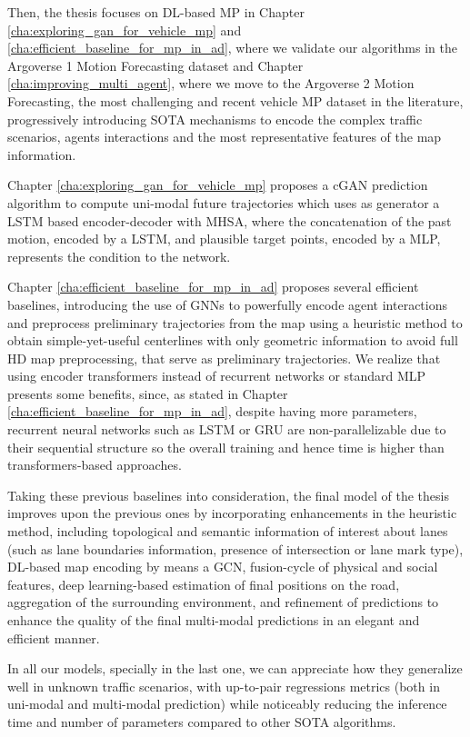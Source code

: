 Then, the thesis focuses on \acf{DL}-based \ac{MP} in Chapter \ref{cha:exploring_gan_for_vehicle_mp} and \ref{cha:efficient_baseline_for_mp_in_ad}, where we validate our algorithms in the Argoverse 1 Motion Forecasting dataset and Chapter \ref{cha:improving_multi_agent}, where we move to the Argoverse 2 Motion Forecasting, the most challenging and recent vehicle \ac{MP} dataset in the literature, progressively introducing \acf{SOTA} mechanisms to encode the complex traffic scenarios, agents interactions and the most representative features of the map information. 

Chapter \ref{cha:exploring_gan_for_vehicle_mp} proposes a \acf{cGAN} prediction algorithm to compute uni-modal future trajectories which uses as generator a \acf{LSTM} based encoder-decoder with \acf{MHSA}, where the concatenation of the past motion, encoded by a \ac{LSTM}, and plausible target points, encoded by a \acf{MLP}, represents the condition to the network. 

Chapter \ref{cha:efficient_baseline_for_mp_in_ad} proposes several efficient baselines, introducing the use of \acfp{GNN} to powerfully encode agent interactions and preprocess preliminary trajectories from the map using a heuristic method to obtain simple-yet-useful centerlines with only geometric information to avoid full HD map preprocessing, that serve as preliminary trajectories. We realize that using encoder transformers instead of recurrent networks or standard \ac{MLP} presents some benefits, since, as stated in Chapter \ref{cha:efficient_baseline_for_mp_in_ad}, despite having more parameters, recurrent neural networks such as \acf{LSTM} or \acf{GRU} are non-parallelizable due to their sequential structure so the overall training and hence time is higher than transformers-based approaches.

Taking these previous baselines into consideration, the final model of the thesis improves upon the previous ones by incorporating enhancements in the heuristic method, including topological and semantic information of interest about lanes (such as lane boundaries information, presence of intersection or lane mark type), \acf{DL}-based map encoding by means a \acf{GCN}, fusion-cycle of physical and social features, deep learning-based estimation of final positions on the road, aggregation of the surrounding environment, and refinement of predictions to enhance the quality of the final multi-modal predictions in an elegant and efficient manner.

In all our models, specially in the last one, we can appreciate how they generalize well in unknown traffic scenarios, with up-to-pair regressions metrics (both in uni-modal and multi-modal prediction) while noticeably reducing the inference time and number of parameters compared to other \ac{SOTA} algorithms.

